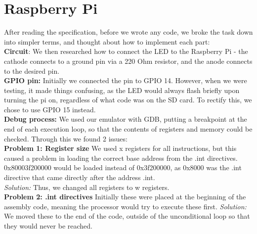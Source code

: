 \documentclass[11pt]{article}
\begin{document}
\section{Raspberry Pi}
After reading the specification, before we wrote any code, we broke the task down into simpler terms, and thought about how to implement each part:\\
\textbf{Circuit}: We then researched how to connect the LED to the Raspberry Pi - the cathode connects to a ground pin via a 220 Ohm resistor, and the anode connects to the desired pin.\\
\textbf{GPIO pin:} Initially we connected the pin to GPIO 14. However, when we were testing, it made things confusing, as the LED would always flash briefly upon turning the pi on, regardless of what code was on the SD card. To rectify this, we chose to use GPIO 15 instead. \\
\textbf{Debug process:} We used our emulator with GDB, putting a breakpoint at the end of each execution loop, so that the contents of registers and memory could be checked. Through this we found 2 issues:\\
\textbf{Problem 1: Register size} We used x registers for all instructions, but this caused a problem in loading the correct base address from the .int directives. 0x80003f200000 would be loaded instead of 0x3f200000, as 0x8000 was the .int  directive that came directly after the address .int.\\\textit{Solution: }Thus, we changed all registers to w registers.\\
\textbf{Problem 2: .int directives} Initially these were placed at the beginning of the assembly code, meaning the processor would try to execute these first. \textit{Solution: }We moved these to the end of the code, outside of the unconditional loop so that they would never be reached.
\end{document}

